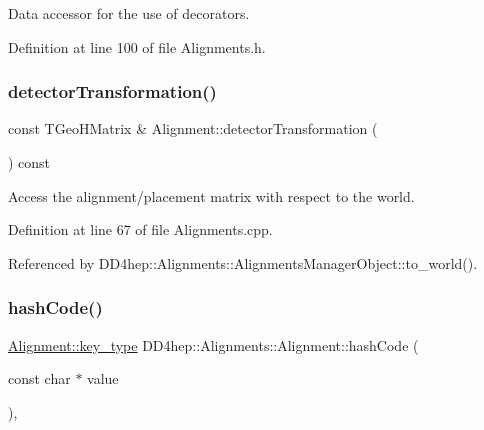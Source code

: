 Data accessor for the use of decorators. 



Definition at line 100 of file Alignments.\+h.

\hypertarget{class_d_d4hep_1_1_alignments_1_1_alignment_a8aae88c06deba1f46de0412c70399d6c}{}\label{class_d_d4hep_1_1_alignments_1_1_alignment_a8aae88c06deba1f46de0412c70399d6c} 
\subsubsection{\texorpdfstring{detector\+Transformation()}{detectorTransformation()}}
{\footnotesize\ttfamily const T\+Geo\+H\+Matrix \& Alignment\+::detector\+Transformation (\begin{DoxyParamCaption}{ }\end{DoxyParamCaption}) const}



Access the alignment/placement matrix with respect to the world. 



Definition at line 67 of file Alignments.\+cpp.



Referenced by D\+D4hep\+::\+Alignments\+::\+Alignments\+Manager\+Object\+::to\+\_\+world().

\hypertarget{class_d_d4hep_1_1_alignments_1_1_alignment_a18d349855ba9d9d8ae27949f9fbc020f}{}\label{class_d_d4hep_1_1_alignments_1_1_alignment_a18d349855ba9d9d8ae27949f9fbc020f} 
\subsubsection{\texorpdfstring{hash\+Code()}{hashCode()}\hspace{0.1cm}{\footnotesize\ttfamily [1/2]}}
{\footnotesize\ttfamily \hyperlink{class_d_d4hep_1_1_alignments_1_1_alignment_ab824a65f935a0c79b9ea1a7a85014b88}{Alignment\+::key\+\_\+type} D\+D4hep\+::\+Alignments\+::\+Alignment\+::hash\+Code (\begin{DoxyParamCaption}\item[{const char $\ast$}]{value }\end{DoxyParamCaption})\hspace{0.3cm}{\ttfamily [inline]}, {\ttfamily [static]}}



